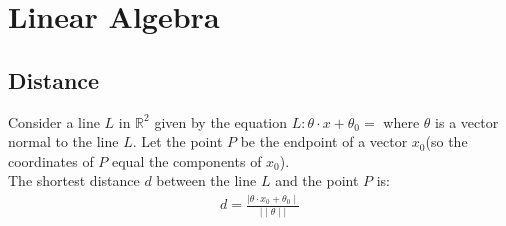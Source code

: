 \section{Linear Algebra}

\subsection{Distance}

Consider a line  $L$  in  $\mathbb{R}^2$  given by the equation $L:\theta \cdot x + \theta_0=$ where $\theta$ is a vector normal to the line $L$. Let the point $P$ be the endpoint of a vector $x_0$(so the coordinates of $P$  equal the components of $x_0$).\\

The shortest distance $d$ between the line $L$ and the point $P$ is:
\begin{align*}
d= \displaystyle \frac{\mid \theta \cdot x_0+ \theta _0\mid }{\mid \mid \theta \mid \mid }
\end{align*}